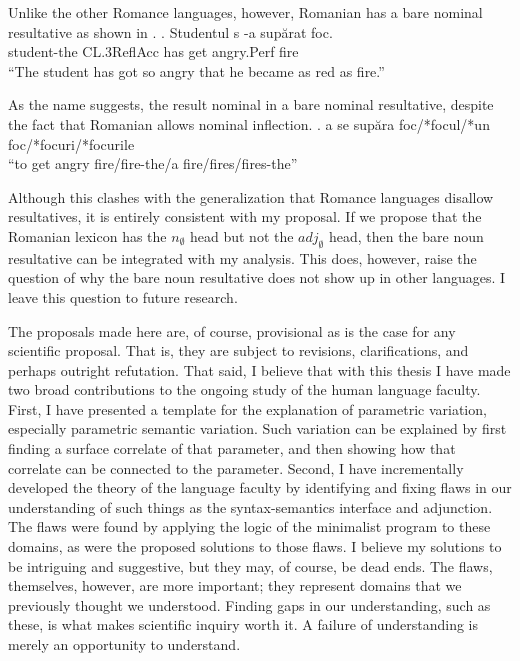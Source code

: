 Unlike the other Romance languages, however, Romanian has a bare nominal resultative as shown in \Next.
\exg. Studentul s -a sup\u{a}rat foc.\\
student-the CL.3ReflAcc has get angry.Perf fire\\
``The student has got so angry that he became as red as fire.''\parencite{farkas2011predicative}

As the name suggests, the result nominal in a bare nominal resultative, despite the fact that Romanian allows nominal inflection.
\ex. a se sup\u{a}ra foc/*focul/*un foc/*focuri/*focurile\\
``to get angry fire/fire-the/a fire/fires/fires-the'' \parencite{farkas2011predicative}

Although this clashes with the generalization that Romance languages disallow resultatives, it is entirely consistent with my proposal.
If we propose that the Romanian lexicon has the $n_{\emptyset}$ head but not the $adj_{\emptyset}$ head, then the bare noun resultative can be integrated with my analysis.
This does, however, raise the question of why the bare noun resultative does not show up in other languages.
I leave this question to future research.


The proposals made here are, of course, provisional as is the case for any scientific proposal.
That is, they are subject to revisions, clarifications, and perhaps outright refutation.
That said, I believe that with this thesis I have made two broad contributions to the ongoing study of the human language faculty.
First, I have presented a template for the explanation of parametric variation, especially parametric semantic variation.
Such variation can be explained by first finding a surface correlate of that parameter, and then showing how that correlate can be connected to the parameter.
Second, I have incrementally developed the theory of the language faculty by identifying and fixing flaws in our understanding of such things as the syntax-semantics interface and adjunction.
The flaws were found by applying the logic of the minimalist program to these domains, as were the proposed solutions to those flaws.
I believe my solutions to be intriguing and suggestive, but they may, of course, be dead ends.
The flaws, themselves, however, are more important; they represent domains that we previously thought we understood.
Finding gaps in our understanding, such as these, is what makes scientific inquiry worth it.
A failure of understanding is merely an opportunity to understand.
